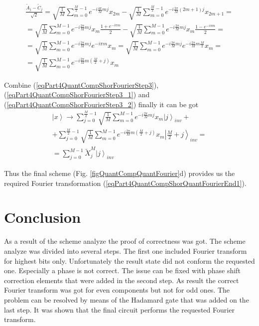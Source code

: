 \documentclass{llncs}
\begin{document}
\begin{eqnarray}
\frac{\tilde{A}_{j} - \tilde{C}_{j} }{\sqrt{2}} = 
\sqrt{\frac{1}{M}} 
\sum_{m = 0}^{\frac{M}{2} - 1} e^{-i \frac{4 \pi}{M} m j} x_{2m}  -
\sqrt{\frac{1}{M}} 
\sum_{m = 0}^{\frac{M}{2} - 1} 
e^{-i \frac{2 \pi}{M} \left(2m+1\right) j} x_{2m+1}
= 
\nonumber \\
=
\sqrt{\frac{1}{M}} \sum_{m = 0}^{M - 1}
e^{-i \frac{2 \pi}{M} m j} x_{m} \frac{1 + e^{-i \pi m}}{2}
-
\sqrt{\frac{1}{M}} \sum_{m = 0}^{M - 1}
e^{-i \frac{2 \pi}{M} m j} x_{m} \frac{1 - e^{-i \pi m}}{2} 
=
\nonumber \\
=
\sqrt{\frac{1}{M}} \sum_{m = 0}^{M - 1}
e^{-i \frac{2 \pi}{M} m j} e^{-i \pi m } x_{m} 
=
\sqrt{\frac{1}{M}} \sum_{m = 0}^{M - 1}
e^{-i \frac{2 \pi}{M} m j} e^{-i \frac{2 \pi}{M} m \frac{M}{2} } x_{m} 
=
\nonumber \\
=
\sqrt{\frac{1}{M}} \sum_{m = 0}^{M - 1}
e^{-i \frac{2 \pi}{M} m \left(\frac{M}{2} + j\right)} x_{m}
\label{eqPart4QuantCompShorFourierStep3_2}
\end{eqnarray}

Combine (\ref{eqPart4QuantCompShorFourierStep3}), 
(\ref{eqPart4QuantCompShorFourierStep3_1}) and
(\ref{eqPart4QuantCompShorFourierStep3_2}) finally it can be got  
\begin{eqnarray}
\left|x\right> \rightarrow
\sum_{j = 0}^{\frac{M}{2} - 1} \sqrt{\frac{1}{M}} \sum_{m = 0}^{M - 1}
e^{-i \frac{2 \pi}{M} m j} x_{m} \left|j\right>_{inv} +
\nonumber \\
+
\sum_{j = 0}^{\frac{M}{2} - 1} \sqrt{\frac{1}{M}} \sum_{m = 0}^{M - 1}
e^{-i \frac{2 \pi}{M} m \left(\frac{M}{2} + j\right)} x_{m} 
\left|\frac{M}{2} + j\right>_{inv} =
\nonumber \\
= \sum_{j = 0}^{M - 1} \tilde{X}_j^{M} \left|j\right>_{inv}
\nonumber
\end{eqnarray}

Thus the final scheme (Fig. \ref{figQuantCompQuantFourier}d)
provides us the required Fourier transformation
(\ref{eqPart4QuantCompShorQuantFourierEnd1}).

\section{Conclusion}
As a result of the scheme analyze the proof of correctness was
got. The scheme analyze was divided into several steps. The first one
included Fourier transform for highest bits only. Unfortunately the
result state did not conform the requested one. Especially a phase is
not correct. The issue can be fixed with phase shift correction
elements that were added in the second step. As result the correct
Fourier transform was got for even components but not for odd
ones. The problem can be resolved by means of the Hadamard gate that was
added on the last step. It was shown that the final circuit performs
the requested Fourier transform.   
\end{document}
